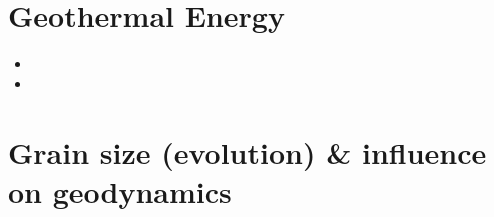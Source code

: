 \section{Geothermal Energy} 

\begin{small}
\begin{itemize}
\item[\twothousandfifteen]
\item[\twothousandnineteen]
\end{itemize}
\end{small}

\section{Grain size (evolution) \& influence on geodynamics}
\label{sec:topics:gsev}

